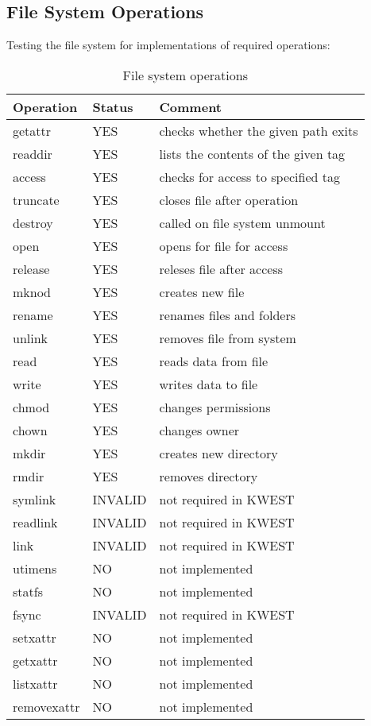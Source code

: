 \subsection{File System Operations}
Testing the file system for implementations of required operations:
\begin{table}[h]
\begin{tabular}{|p{2cm}|p{2cm}|p{8cm}|}
\hline
\textbf{Operation} & \textbf{Status} & \textbf{Comment} \\ \hline
getattr & YES & checks whether the given path exits \\
readdir	 & YES & lists the contents of the given tag \\
access	& YES & checks for access to specified tag \\
truncate	 & YES & closes file after operation \\
destroy	 & YES & called on file system unmount \\
open		& YES & opens for file for access \\
release	& YES & releses file after access \\
mknod		& YES & creates new file \\
rename		& YES & renames files and folders \\
unlink		& YES & removes file from system \\
read		& YES & reads data from file \\
write		& YES & writes data to file \\
chmod		& YES & changes permissions \\
chown		& YES & changes owner\\
mkdir		& YES & creates new directory \\
rmdir		& YES & removes directory\\

symlink	 & INVALID & not required in KWEST \\ 
readlink & INVALID & not required in KWEST \\
link		& INVALID & not required in KWEST \\
utimens	& NO & not implemented \\
statfs	& NO & not implemented \\
fsync & INVALID & not required in KWEST \\

setxattr	& NO & not implemented \\
getxattr	& NO & not implemented \\
listxattr	& NO & not implemented \\
removexattr	& NO & not implemented \\
\hline
\end{tabular}
\caption{File system operations}
\label{fsop}
\end{table}

